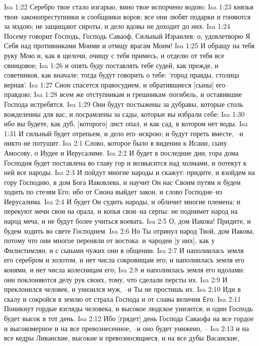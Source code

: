 Isa 1:22  Серебро твое стало изгарью, вино твое испорчено водою;
Isa 1:23  князья твои--законопреступники и сообщники воров; все они любят подарки и гоняются за мздою; не защищают сироты, и дело вдовы не доходит до них.
Isa 1:24  Посему говорит Господь, Господь Саваоф, Сильный Израилев: о, удовлетворю Я Себя над противниками Моими и отмщу врагам Моим!
Isa 1:25  И обращу на тебя руку Мою и, как в щелочи, очищу с тебя примесь, и отделю от тебя все свинцовое;
Isa 1:26  и опять буду поставлять тебе судей, как прежде, и советников, как вначале; тогда будут говорить о тебе: `город правды, столица верная'.
Isa 1:27  Сион спасется правосудием, и обратившиеся [сыны] его--правдою;
Isa 1:28  всем же отступникам и грешникам--погибель, и оставившие Господа истребятся.
Isa 1:29  Они будут постыжены за дубравы, которые столь вожделенны для вас, и посрамлены за сады, которые вы избрали себе;
Isa 1:30  ибо вы будете, как дуб, [которого] лист опал, и как сад, в котором нет воды.
Isa 1:31  И сильный будет отрепьем, и дело его--искрою; и будут гореть вместе, --и никто не потушит.
Isa 2:1  Слово, которое было в видении к Исаии, сыну Амосову, о Иудее и Иерусалиме.
Isa 2:2  И будет в последние дни, гора дома Господня будет поставлена во главу гор и возвысится над холмами, и потекут к ней все народы.
Isa 2:3  И пойдут многие народы и скажут: придите, и взойдем на гору Господню, в дом Бога Иаковлева, и научит Он нас Своим путям и будем ходить по стезям Его; ибо от Сиона выйдет закон, и слово Господне--из Иерусалима.
Isa 2:4  И будет Он судить народы, и обличит многие племена; и перекуют мечи свои на орала, и копья свои--на серпы: не поднимет народ на народ меча, и не будут более учиться воевать.
Isa 2:5  О, дом Иакова! Придите, и будем ходить во свете Господнем.
Isa 2:6  Но Ты отринул народ Твой, дом Иакова, потому что они многое переняли от востока: и чародеи [у них], как у Филистимлян, и с сынами чужих они в общении.
Isa 2:7  И наполнилась земля его серебром и золотом, и нет числа сокровищам его; и наполнилась земля его конями, и нет числа колесницам его;
Isa 2:8  и наполнилась земля его идолами: они поклоняются делу рук своих, тому, что сделали персты их.
Isa 2:9  И преклонился человек, и унизился муж, --и Ты не простишь их.
Isa 2:10  Иди в скалу и сокройся в землю от страха Господа и от славы величия Его.
Isa 2:11  Поникнут гордые взгляды человека, и высокое людское унизится; и один Господь будет высок в тот день.
Isa 2:12  Ибо [грядет] день Господа Саваофа на все гордое и высокомерное и на все превознесенное, --и оно будет унижено, --
Isa 2:13  и на все кедры Ливанские, высокие и превозносящиеся, и на все дубы Васанские,
